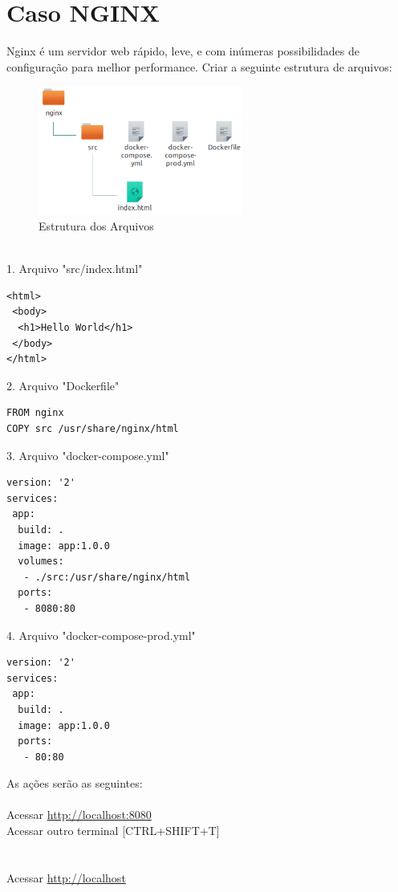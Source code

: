 \documentclass[a4paper,11pt]{article}
\begin{document}
\section{Caso NGINX}
Nginx é um servidor web rápido, leve, e com inúmeras possibilidades de configuração para melhor performance. Criar a seguinte estrutura de arquivos:
\begin{figure}[!htb]
	\centering
	\includegraphics[width=0.6\textwidth]{imagem/estnginx.png}
	\caption{Estrutura dos Arquivos}
\end{figure} \\
1. Arquivo "src/index.html"
\begin{lstlisting}
<html>
 <body>
  <h1>Hello World</h1>
 </body>
</html>
\end{lstlisting}
2. Arquivo "Dockerfile"
\begin{lstlisting}
FROM nginx
COPY src /usr/share/nginx/html
\end{lstlisting}
3. Arquivo "docker-compose.yml"
\begin{lstlisting}
version: '2'
services:
 app:
  build: .
  image: app:1.0.0
  volumes:
   - ./src:/usr/share/nginx/html
  ports:
   - 8080:80 
\end{lstlisting}
4. Arquivo "docker-compose-prod.yml"
\begin{lstlisting}
version: '2'
services:
 app:
  build: .
  image: app:1.0.0
  ports:
   - 80:80 
\end{lstlisting}
As ações serão as seguintes: \\
 \\
Acessar \url{http://localhost:8080} \\
Acessar outro terminal [CTRL+SHIFT+T] \\
 \\
 \\
Acessar \url{http://localhost} \\
\end{document}
